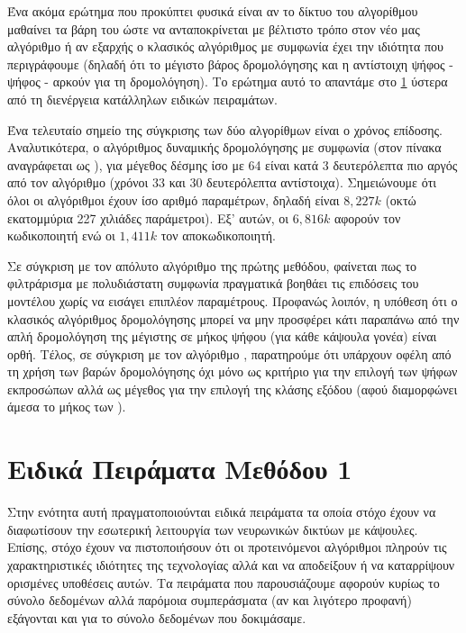 Ένα ακόμα ερώτημα που προκύπτει φυσικά είναι αν το δίκτυο του αλγορίθμου  μαθαίνει τα βάρη του ώστε να ανταποκρίνεται με βέλτιστο τρόπο στον νέο μας αλγόριθμο ή αν εξαρχής ο κλασικός αλγόριθμος με συμφωνία έχει την ιδιότητα που περιγράφουμε (δηλαδή ότι το μέγιστο βάρος δρομολόγησης και η αντίστοιχη ψήφος - ψήφος  - αρκούν για τη δρομολόγηση). Το ερώτημα αυτό το απαντάμε στο \ref{sec:method1_special_experiments} ύστερα από τη διενέργεια κατάλληλων ειδικών πειραμάτων.\par

Ένα τελευταίο σημείο της σύγκρισης των δύο αλγορίθμων είναι ο χρόνος επίδοσης. Αναλυτικότερα, ο αλγόριθμος δυναμικής δρομολόγησης με συμφωνία (στον πίνακα αναγράφεται ως ), για μέγεθος δέσμης ίσο με 64 είναι κατά 3 δευτερόλεπτα πιο αργός από τον αλγόριθμο  (χρόνοι 33 και 30 δευτερόλεπτα αντίστοιχα). Σημειώνουμε ότι όλοι οι αλγόριθμοι έχουν ίσο αριθμό παραμέτρων, δηλαδή είναι $8,227k$ (οκτώ εκατομμύρια 227 χιλιάδες παράμετροι). Εξ' αυτών, οι $6,816k$ αφορούν τον κωδικοποιητή ενώ οι $1,411k$ τον αποκωδικοποιητή.\par  

Σε σύγκριση με τον απόλυτο αλγόριθμο  της πρώτης μεθόδου, φαίνεται πως το φιλτράρισμα με πολυδιάστατη συμφωνία πραγματικά βοηθάει τις επιδόσεις του μοντέλου χωρίς να εισάγει επιπλέον παραμέτρους. Προφανώς λοιπόν, η υπόθεση ότι ο κλασικός αλγόριθμος δρομολόγησης μπορεί να μην προσφέρει κάτι παραπάνω από την απλή δρομολόγηση της μέγιστης σε μήκος ψήφου (για κάθε κάψουλα γονέα) είναι ορθή. Τέλος, σε σύγκριση με τον αλγόριθμο , παρατηρούμε ότι υπάρχουν οφέλη από τη χρήση των βαρών δρομολόγησης όχι μόνο ως κριτήριο για την επιλογή των ψήφων εκπροσώπων αλλά ως μέγεθος για την επιλογή της κλάσης εξόδου (αφού διαμορφώνει άμεσα το μήκος των ).

\section{Ειδικά Πειράματα Μεθόδου 1}
\label{sec:method1_special_experiments}
Στην ενότητα αυτή πραγματοποιούνται ειδικά πειράματα τα οποία στόχο έχουν να διαφωτίσουν την εσωτερική λειτουργία των νευρωνικών δικτύων με κάψουλες. Επίσης, στόχο έχουν να πιστοποιήσουν ότι οι προτεινόμενοι αλγόριθμοι πληρούν τις χαρακτηριστικές ιδιότητες της τεχνολογίας αλλά και να αποδείξουν ή να καταρρίψουν ορισμένες υποθέσεις αυτών. Τα πειράματα που παρουσιάζουμε αφορούν κυρίως το σύνολο δεδομένων  αλλά παρόμοια συμπεράσματα (αν και λιγότερο προφανή) εξάγονται και για το σύνολο δεδομένων  που δοκιμάσαμε.

